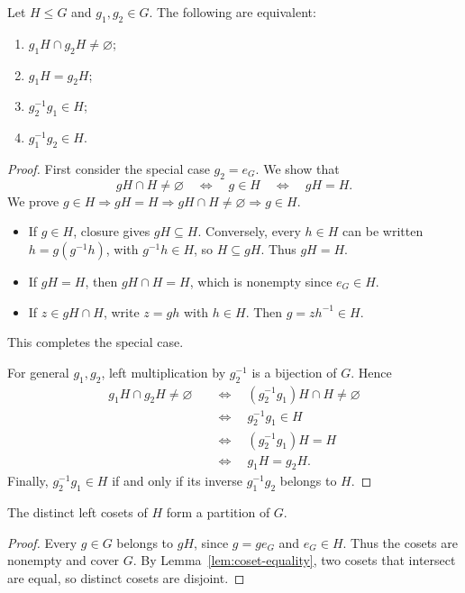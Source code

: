 \documentclass[reqno,11pt]{amsart}
\begin{document}
\begin{lemma}\label{lem:coset-equality}
Let $H\leq G$ and $g_1,g_2\in G$. The following are equivalent:
\begin{enumerate}[label=\textbf{(\arabic*)}]
  \item $g_1H\cap g_2H\neq\varnothing$;
  \item $g_1H=g_2H$;
  \item $g_2^{-1}g_1\in H$;
  \item $g_1^{-1}g_2\in H$.
\end{enumerate}
\end{lemma}
\begin{proof}
First consider the special case $g_2=e_G$. We show that
\[
  gH\cap H\neq\varnothing
  \quad\Longleftrightarrow\quad g\in H
  \quad\Longleftrightarrow\quad gH=H.
\]
We prove $g\in H\Rightarrow gH=H\Rightarrow gH\cap H\neq\varnothing
\Rightarrow g\in H$.
\begin{itemize}
  \item If $g\in H$, closure gives $gH\subseteq H$. Conversely, every
  $h\in H$ can be written $h=g(g^{-1}h)$, with $g^{-1}h\in H$, so
  $H\subseteq gH$. Thus $gH=H$.
  \item If $gH=H$, then $gH\cap H=H$, which is nonempty since
  $e_G\in H$.
  \item If $z\in gH\cap H$, write $z=gh$ with $h\in H$. Then
  $g=zh^{-1}\in H$.
\end{itemize}
This completes the special case.

For general $g_1,g_2$, left multiplication by $g_2^{-1}$ is a bijection
of $G$. Hence
\begin{align*}
  g_1H\cap g_2H\neq\varnothing
  &\quad\Longleftrightarrow\quad
  (g_2^{-1}g_1)H\cap H\neq\varnothing\\
  &\quad\Longleftrightarrow\quad g_2^{-1}g_1\in H\\
  &\quad\Longleftrightarrow\quad (g_2^{-1}g_1)H=H\\
  &\quad\Longleftrightarrow\quad g_1H=g_2H.
\end{align*}
Finally, $g_2^{-1}g_1\in H$ if and only if its inverse
$g_1^{-1}g_2$ belongs to $H$.
\end{proof}

\begin{proposition}
The distinct left cosets of $H$ form a partition of $G$.
\end{proposition}
\begin{proof}
Every $g\in G$ belongs to $gH$, since $g=ge_G$ and $e_G\in H$.
Thus the cosets are nonempty and cover $G$. By
Lemma~\ref{lem:coset-equality}, two cosets that intersect are equal, so
distinct cosets are disjoint.
\end{proof}
\end{document}
